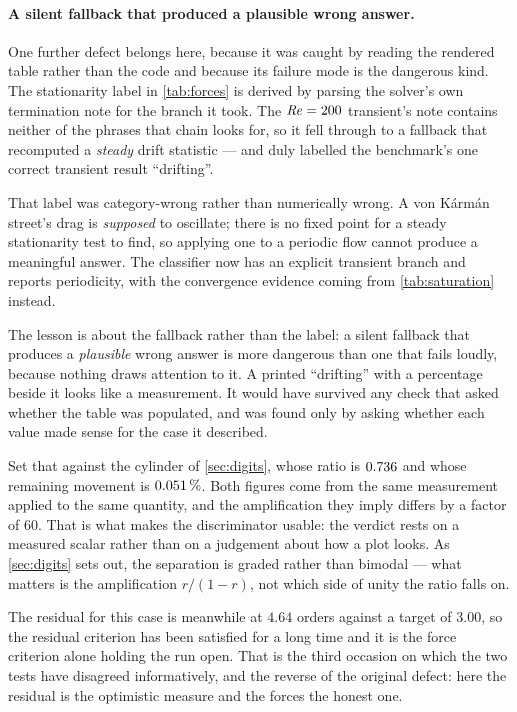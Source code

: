 \paragraph{A silent fallback that produced a plausible wrong answer.} One further defect
belongs here, because it was caught by reading the rendered table rather than the code and
because its failure mode is the dangerous kind. The stationarity label in
\cref{tab:forces} is derived by parsing the solver's own termination note for the branch
it took. The $\mathit{Re}=200$ transient's note contains neither of the phrases that chain
looks for, so it fell through to a fallback that recomputed a \emph{steady} drift
statistic --- and duly labelled the benchmark's one correct transient result
``drifting''.

That label was category-wrong rather than numerically wrong. A von K\'arm\'an street's
drag is \emph{supposed} to oscillate; there is no fixed point for a steady stationarity
test to find, so applying one to a periodic flow cannot produce a meaningful answer. The
classifier now has an explicit transient branch and reports periodicity, with the
convergence evidence coming from \cref{tab:saturation} instead.

The lesson is about the fallback rather than the label: a silent fallback that produces a
\emph{plausible} wrong answer is more dangerous than one that fails loudly, because
nothing draws attention to it. A printed ``drifting'' with a percentage beside
it looks like a measurement. It would have survived any check that asked whether the
table was populated, and was found only by asking whether each value made sense for the
case it described.

Set that against the cylinder of \cref{sec:digits}, whose ratio is
$\num{0.736}$ and whose remaining movement is
$\num{0.051}\,\%$. Both figures come from the same measurement applied to
the same quantity, and the amplification they imply differs by a factor of
$60$. That is what makes the discriminator usable: the verdict rests on a measured scalar
rather than on a judgement about how a plot looks. As \cref{sec:digits} sets out, the
separation is graded rather than bimodal --- what matters is the amplification $r/(1-r)$,
not which side of unity the ratio falls on.

The residual for this case is meanwhile at $4.64$ orders against a target of $3.00$, so
the residual criterion has been satisfied for a long time and it is the force criterion
alone holding the run open. That is the third occasion on which the two tests have
disagreed informatively, and the reverse of the original defect: here the residual is the
optimistic measure and the forces the honest one.

